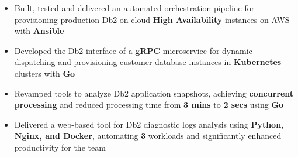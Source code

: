 \documentclass[10pt,a4paper]{altacv}
\begin{document}
\tagline{}

\begin{fullwidth}
\makecvheader
\end{fullwidth}




 \begin{itemize} 
 \item Built, tested and delivered an automated orchestration pipeline for provisioning production Db2 on cloud \textbf{High Availability} instances on AWS with \textbf{Ansible} \\
 \item Developed the Db2 interface of a \textbf{gRPC} microservice for dynamic dispatching and provisioning customer database instances in \textbf{Kubernetes} clusters  with \textbf{Go}
 \item Revamped tools to analyze Db2 application snapshots, achieving \textbf{concurrent processing} and reduced processing time from \textbf{3 mins} to \textbf{2 secs} using \textbf{Go}
  \item Delivered a web-based tool for Db2 diagnostic logs analysis using \textbf{Python, Nginx, and Docker}, automating \textbf{3} workloads and significantly enhanced productivity for the team	
  
 \end{itemize}
 
\end{document}
